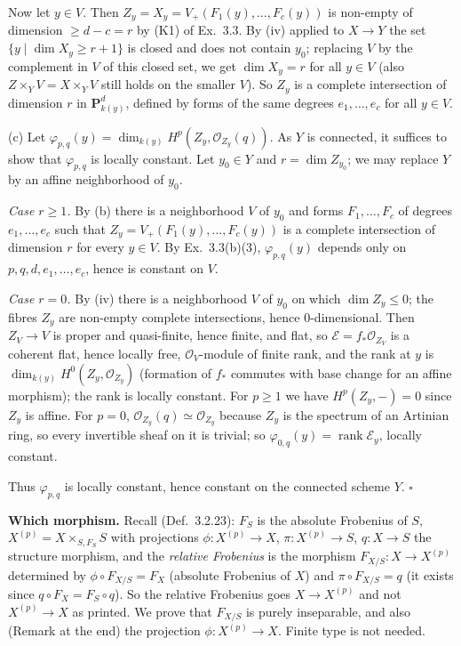 \documentclass[11pt]{article}
\begin{document}
Now let $y\in V$. Then $Z_y=X_y=V_+(F_1(y),\dots,F_c(y))$ is non-empty of dimension $\ge d-c=r$ by (K1) of Ex.~3.3. By (iv) applied to $X\to Y$ the set $\{y\mid\dim X_y\ge r+1\}$ is closed and does not contain $y_0$; replacing $V$ by the complement in $V$ of this closed set, we get $\dim X_y=r$ for all $y\in V$ (also $Z\times_YV=X\times_YV$ still holds on the smaller $V$). So $Z_y$ is a complete intersection of dimension $r$ in $\mathbf P^d_{k(y)}$, defined by forms of the same degrees $e_1,\dots,e_c$ for all $y\in V$.

(c) Let $\varphi_{p,q}(y)=\dim_{k(y)}H^p(Z_y,\mathcal O_{Z_y}(q))$. As $Y$ is connected, it suffices to show that $\varphi_{p,q}$ is locally constant. Let $y_0\in Y$ and $r=\dim Z_{y_0}$; we may replace $Y$ by an affine neighborhood of $y_0$.

\emph{Case $r\ge1$.} By (b) there is a neighborhood $V$ of $y_0$ and forms $F_1,\dots,F_c$ of degrees $e_1,\dots,e_c$ such that $Z_y=V_+(F_1(y),\dots,F_c(y))$ is a complete intersection of dimension $r$ for every $y\in V$. By Ex.~3.3(b)(3), $\varphi_{p,q}(y)$ depends only on $p,q,d,e_1,\dots,e_c$, hence is constant on $V$.

\emph{Case $r=0$.} By (iv) there is a neighborhood $V$ of $y_0$ on which $\dim Z_y\le0$; the fibres $Z_y$ are non-empty complete intersections, hence $0$-dimensional. Then $Z_V\to V$ is proper and quasi-finite, hence finite, and flat, so $\mathcal E=f_*\mathcal O_{Z_V}$ is a coherent flat, hence locally free, $\mathcal O_V$-module of finite rank, and the rank at $y$ is $\dim_{k(y)}H^0(Z_y,\mathcal O_{Z_y})$ (formation of $f_*$ commutes with base change for an affine morphism); the rank is locally constant. For $p\ge1$ we have $H^p(Z_y,-)=0$ since $Z_y$ is affine. For $p=0$, $\mathcal O_{Z_y}(q)\simeq\mathcal O_{Z_y}$ because $Z_y$ is the spectrum of an Artinian ring, so every invertible sheaf on it is trivial; so $\varphi_{0,q}(y)=\operatorname{rank}\mathcal E_y$, locally constant.

Thus $\varphi_{p,q}$ is locally constant, hence constant on the connected scheme $Y$. \hfill$\square$

\pf
\textbf{Which morphism.} Recall (Def.~3.2.23): $F_S$ is the absolute Frobenius of $S$, $X^{(p)}=X\times_{S,F_S}S$ with projections $\phi:X^{(p)}\to X$, $\pi:X^{(p)}\to S$, $q:X\to S$ the structure morphism, and the \emph{relative Frobenius} is the morphism $F_{X/S}:X\to X^{(p)}$ determined by $\phi\circ F_{X/S}=F_X$ (absolute Frobenius of $X$) and $\pi\circ F_{X/S}=q$ (it exists since $q\circ F_X=F_S\circ q$). So the relative Frobenius goes $X\to X^{(p)}$ and not $X^{(p)}\to X$ as printed. We prove that $F_{X/S}$ is purely inseparable, and also (Remark at the end) the projection $\phi:X^{(p)}\to X$. Finite type is not needed.
\end{document}
